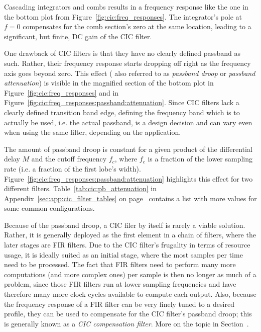 Cascading integrators and  combs results in a frequency response  like the one
in the bottom  plot from Figure~\ref{fig:cic:freq_responses}. The integrator's
pole at $f = 0$ compensates for  the comb section's zero at the same location,
leading to a significant, but finite, DC gain of the CIC filter.

One drawback  of CIC  filters is  that they have  no clearly  defined passband
as  such. Rather,  their  frequency  response starts  dropping  off  right  as
the  frequency axis  goes  beyond  zero. This effect  (  also  referred to  as
\emph{passband  droop}  or  \emph{passband  attenuation}) is  visible  in  the
magnified section  of the  bottom plot  in Figure~\ref{fig:cic:freq_responses}
and  in   Figure~\ref{fig:cic:freq_responses:passband:attenuation}. Since  CIC
filters lack  a clearly defined  transition band edge, defining  the frequency
band which  is to  actually be  used, i.e.  the actual  passband, is  a design
decision  and can  vary even  when  using the  same filter,  depending on  the
application.

The  amount  of  passband  droop  is  constant for  a  given  product  of  the
differential  delay $M$  and  the cutoff  frequency $f_c$,  where  $f_c$ is  a
fraction  of the  lower sampling  rate (i.e.  a fraction  of the  first lobe's
width). Figure~\ref{fig:cic:freq_responses:passband:attenuation}    highlights
this  effect  for  two  different  filters. Table~\ref{tab:cic:pb_attenuation}
in                 Appendix~\ref{sec:app:cic_filter_tables}                 on
page~\pageref{tab:cic:pb_attenuation}  contains a  list with  more values  for
some common configurations.

Because  of the  passband droop,  a CIC  filer by  itself is  rarely a  viable
solution. Rather, it is generally deployed as  the first element in a chain of
filters,  where the  later stages  are FIR  filters. Due to  the CIC  filter's
frugality  in terms  of resource  usage, it  is ideally  suited as  an initial
stage, where the most samples per time need to be processed. The fact that FIR
filters need  to perform many  more computations  (and more complex  ones) per
sample is  then no longer as  much of a  problem, since those FIR  filters run
at  lower sampling  frequencies  and  have therefore  many  more clock  cycles
available  to  compute  each  output. Also,  because  the  frequency  response
of  a  FIR  filter can  be  very  finely  tuned  to a  desired  profile,  they
can  be used  to  compensate for  the  CIC filter's  passband  droop; this  is
generally  known as  a \emph{CIC  compensation filter}. More  on the  topic in
Section~\label{subsubsec:cic:compensators}.

